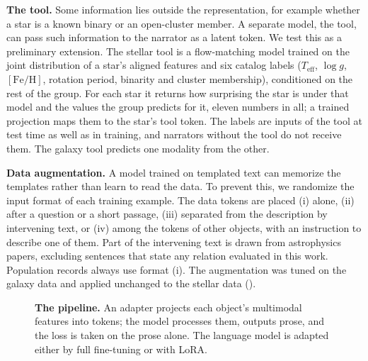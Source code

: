 \textbf{The tool.}\label{sec:ltu} Some information lies outside the representation, for
example whether a star is a known binary or an open-cluster member. A separate model, the tool,
can pass such information to the narrator as a latent token. We test this as a preliminary
extension. The stellar tool is a flow-matching model trained on the joint distribution of a
star's aligned features and six catalog labels ($T_\mathrm{eff}$, $\log g$,
$[\mathrm{Fe/H}]$, rotation period, binarity and cluster membership), conditioned on the rest of
the group. For each star it returns how surprising the star is under that model and the values
the group predicts for it, eleven numbers in all; a trained projection maps them to the star's
tool token. The labels are inputs of the tool at test time as well as in training, and
narrators without the tool do not receive them. The galaxy tool predicts one modality from the
other.

\textbf{Data augmentation.} A model trained on templated text can memorize the
templates rather than learn to read the data. To prevent this, we randomize the
input format of each training example. The data tokens are placed (i) alone,
(ii) after a question or a short passage, (iii) separated from the description by
intervening text, or (iv) among the tokens of other objects, with an instruction
to describe one of them. Part of the intervening text is drawn from astrophysics
papers, excluding sentences that state any relation evaluated in this work.
Population records always use format (i). The augmentation was tuned on the
galaxy data and applied unchanged to the stellar data ().


\begin{figure}[h]
  \centering
  
 \caption{\textbf{The pipeline.} An adapter projects each object's multimodal
  features into tokens; the
  model processes them, outputs prose, and the loss is taken on the prose
  alone. The language model is adapted either by
  full fine-tuning or with LoRA.}
  \label{fig:arch}
\end{figure}
